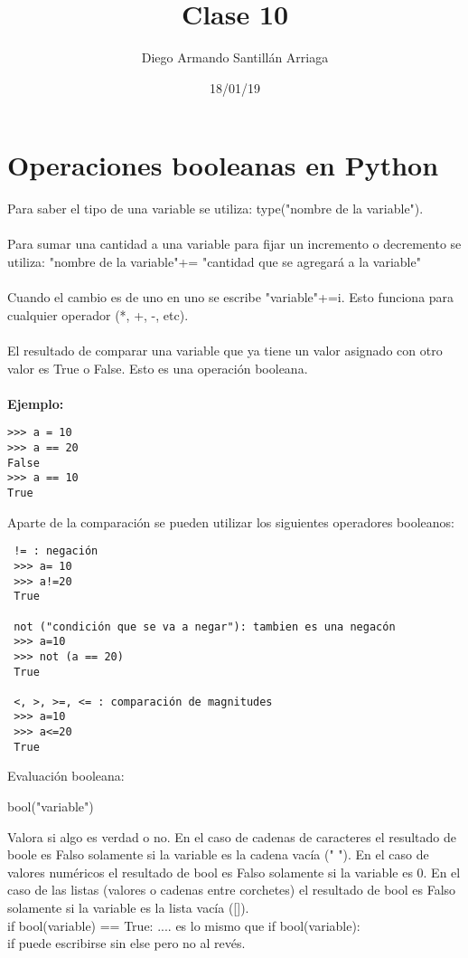 \documentclass[letterpaper, 12pt, oneside]{article}%
\title{\Huge Clase 10}
\author{Diego Armando Santillán Arriaga}
\date{18/01/19}
\begin{document}
\maketitle
\newpage
\section{Operaciones booleanas en Python}
 
Para saber el tipo de una variable se utiliza:
type("nombre de la variable").
\\\\
Para sumar una cantidad a una variable para fijar un incremento
o decremento se utiliza: 
"nombre de la variable"+= "cantidad que se agregará a la variable"
\\\\
Cuando el cambio es de uno en uno se escribe "variable"+=i.
Esto funciona para cualquier operador (*, +, -, etc).
\\\\
El resultado de comparar una variable que ya tiene un valor asignado con
otro valor es True o False. Esto es una operación booleana. 
\\\\
\textbf{Ejemplo:}
\begin{verbatim}
>>> a = 10
>>> a == 20
False
>>> a == 10
True
\end{verbatim}

Aparte de la comparación se pueden utilizar los siguientes operadores booleanos:
\begin{verbatim}
 != : negación
 >>> a= 10
 >>> a!=20
 True

 not ("condición que se va a negar"): tambien es una negacón
 >>> a=10
 >>> not (a == 20)
 True
 
 <, >, >=, <= : comparación de magnitudes
 >>> a=10
 >>> a<=20
 True
 \end{verbatim}
 Evaluación booleana:
 \begin{center}
 bool("variable") 
 \end{center}
Valora si algo es verdad o no. En el caso de cadenas de caracteres el resultado de boole es Falso solamente si la variable es la cadena vacía (" "). En el caso de valores numéricos el resultado de bool es Falso solamente si la variable es 0. En el caso de las listas (valores o cadenas entre corchetes) el resultado de bool es Falso solamente si la variable es la lista vacía ([]).
\\
if bool(variable) == True: .... es lo mismo que if bool(variable):
\\ 
if puede escribirse sin else pero no al revés.
\end{document}
